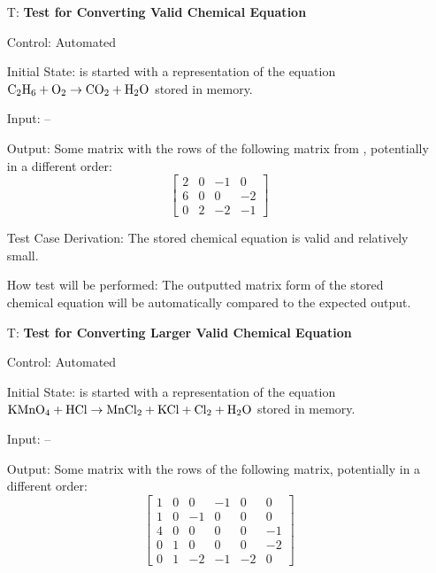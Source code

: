 \documentclass[12pt, titlepage]{article}
\newcounter{testnum} %
\begin{document}
\begin{enumerate}

  \item[T\refstepcounter{testnum}\thetestnum \label{test_convert_valid}:]
    \textbf{Test for Converting Valid Chemical Equation}

    Control: Automated

    Initial State: \progname{} is started with a representation of the equation
    $\ce{C2H6} + \ce{O2} \rightarrow \ce{CO2} + \ce{H2O}$
    \cite{hamid_balancing_2019} stored in memory.

    Input: --

    Output: Some matrix with the rows of the following matrix from
    \cite{hamid_balancing_2019}, potentially in a different order:
    $$\begin{bmatrix}
        2 & 0 & -1 & 0  \\
        6 & 0 & 0  & -2 \\
        0 & 2 & -2 & -1
      \end{bmatrix}$$

    Test Case Derivation: The stored chemical equation is
    valid and relatively small.

    How test will be performed: The outputted matrix form of the stored
    chemical equation will be automatically compared to the expected output.

  \item[T\refstepcounter{testnum}\thetestnum \label{test_convert_larger_valid}:]
    \textbf{Test for Converting Larger Valid Chemical Equation}

    Control: Automated

    Initial State: \progname{} is started with a representation of the equation
    $\ce{KMnO4} + \ce{HCl} \rightarrow \ce{MnCl2} + \ce{KCl} + \ce{Cl2} +
      \ce{H2O}$ \cite{taylor_balancing_2021} stored in memory.

    Input: --

    Output: Some matrix with the rows of the following matrix, potentially in a
    different order:
    $$\begin{bmatrix}
        1 & 0 & 0  & -1 & 0  & 0  \\
        1 & 0 & -1 & 0  & 0  & 0  \\
        4 & 0 & 0  & 0  & 0  & -1 \\
        0 & 1 & 0  & 0  & 0  & -2 \\
        0 & 1 & -2 & -1 & -2 & 0
      \end{bmatrix}$$


\end{enumerate}
\end{document}
